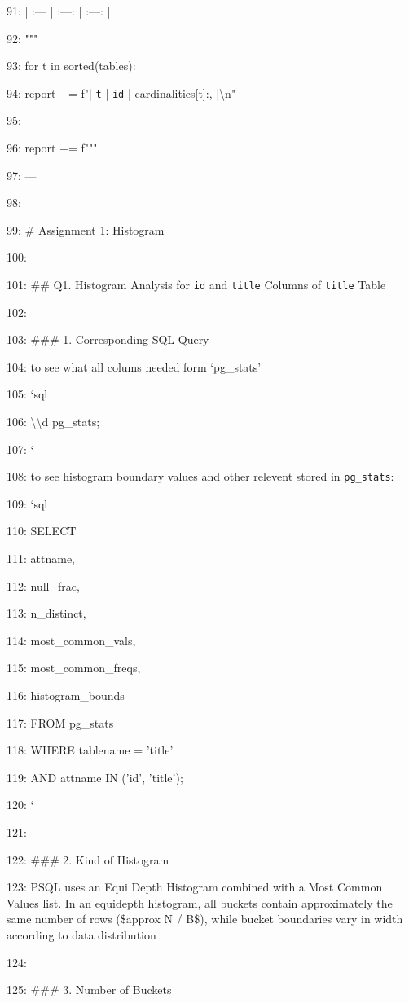 \documentclass[11pt,a4paper]{article}
\begin{document}
{91: | :--- | :---: | :---: |

92: """

93:     for t in sorted(tables):

94:         report += f"| \texttt{{t}} | \texttt{id} | {cardinalities[t]:,} |\textbackslash{}n"

95:

96:     report += f"""

97: ---

98:

99: \# Assignment 1: Histogram

100:

101: \#\# Q1. Histogram Analysis for \texttt{id} and \texttt{title} Columns of \texttt{title} Table

102:

103: \#\#\# 1. Corresponding SQL Query

104: to see what all colums needed form `pg\_stats'

105: \texttt{}`sql

106: \textbackslash{}\textbackslash{}d pg\_stats;

107: \texttt{}`

108: to see histogram boundary values and other relevent  stored in \texttt{pg\_stats}:

109: \texttt{}`sql

110: SELECT

111:     attname,

112:     null\_frac,

113:     n\_distinct,

114:     most\_common\_vals,

115:     most\_common\_freqs,

116:     histogram\_bounds

117: FROM pg\_stats

118: WHERE tablename = 'title'

119:   AND attname IN ('id', 'title');

120: \texttt{}`

121:

122: \#\#\# 2. Kind of Histogram

123: PSQL uses an Equi Depth Histogram combined with a Most Common Values list. In an equidepth histogram, all buckets contain approximately the same number of rows (\$approx N / B\$), while bucket boundaries vary in width according to data distribution

124:

125: \#\#\# 3. Number of Buckets

}
\end{document}
